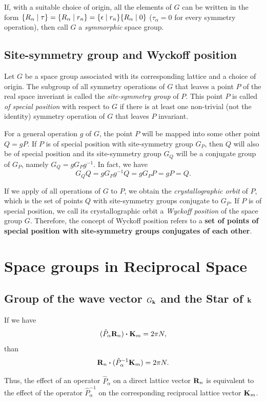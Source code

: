 \documentclass[a4paper,12pt]{report}
\newcommand{\sg}[2]{\{ #1 \mid #2 \}}
\begin{document}
If, with a suitable choice of origin, all the elements of $G$ can be written in the form $\sg{R_\alpha}{\tau} = \sg{R_\alpha}{r_n} = \sg{\eps}{r_n} \sg{R_\alpha}{0}$ ($\tau_\alpha = 0$ for every symmetry operation), then call $G$ a \textit{symmorphic} space group.

\subsection{Site-symmetry group and Wyckoff position}

Let $G$ be a space group associated with its corresponding lattice and a choice of origin. The subgroup of all symmetry operations of $G$ that leaves a point $P$ of the real space inveriant is called the \textit{site-symmetry group} of $P$. This point $P$ is called \textit{of special position} with respect to $G$ if there is at least one non-trivial (not the identity) symmetry operation of $G$ that leaves $P$ invariant.

For a general operation $g$ of $G$, the point $P$ will be mapped into some other point $Q = g P$. If $P$ is of special position with site-symmetry group $G_P$, then $Q$ will also be of special position and its site-symmetry group $G_Q$ will be a conjugate group of $G_P$, namely $G_Q = g G_P g^{-1}$. In fact, we have
$$
G_Q Q = g G_P g^{-1} Q = g G_P P = g P = Q.
$$

If we apply of all operations of $G$ to $P$, we obtain the \textit{crystallographic orbit} of $P$, which is the set of points $Q$ with site-symmetry groups conjugate to $G_P$. If $P$ is of special position, we call its crystallographic orbit a \textit{Wyckoff position} of the space group $G$. Therefore, the concept of Wyckoff position refers to a \textbf{set of points of special position with site-symmetry groups conjugates of each other}.

\section{Space groups in Reciprocal Space}

\subsection{Group of the wave vector $G_{{\vb{k}}}$ and the Star of ${\vb{k}}$}

If we have
$$
(\hat{P}_\alpha \R_n) \vdot \K_m = 2 \pi N,
$$
than
$$
\R_n \vdot (\hat{P}_\alpha^{-1} \K_m) = 2 \pi N.
$$

Thus, the effect of an operator $\hat{P}_\alpha$ on a direct lattice vector ${\vb{R}}_n$ is equivalent to the effect of the operator $\hat{P}_\alpha^{-1}$ on the corresponding reciprocal lattice vector ${\vb{K}}_m$.
\end{document}
